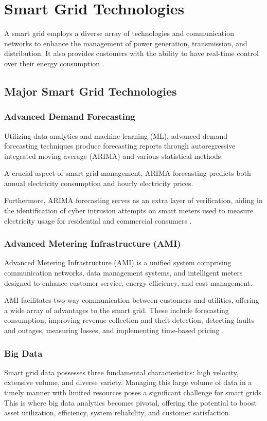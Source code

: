 \newpage







\section{Smart Grid Technologies }
A smart grid employs a diverse array of technologies and communication networks to enhance the management of power generation, transmission, and distribution. It also provides customers with the ability to have real-time control over their energy consumption \cite{WhatIsSmartgrid}.
\subsection{Major Smart Grid Technologies}
\subsubsection{Advanced Demand Forecasting}
Utilizing data analytics and machine learning (ML), advanced demand forecasting techniques produce forecasting reports through autoregressive integrated moving average (ARIMA) and various statistical methods.

A crucial aspect of smart grid management, ARIMA forecasting predicts both annual electricity consumption and hourly electricity prices.

Furthermore, ARIMA forecasting serves as an extra layer of verification, aiding in the identification of cyber intrusion attempts on smart meters used to measure electricity usage for residential and commercial consumers \cite{WhatIsSmartgrid}.
\subsubsection{Advanced Metering Infrastructure (AMI)}
Advanced Metering Infrastructure (AMI) is a unified system comprising communication networks, data management systems, and intelligent meters designed to enhance customer service, energy efficiency, and cost management.

AMI facilitates two-way communication between customers and utilities, offering a wide array of advantages to the smart grid. These include forecasting consumption, improving revenue collection and theft detection, detecting faults and outages, measuring losses, and implementing time-based pricing \cite{WhatIsSmartgrid}.  
\subsubsection{Big Data}
Smart grid data possesses three fundamental characteristics: high velocity, extensive volume, and diverse variety. Managing this large volume of data in a timely manner with limited resources poses a significant challenge for smart grids. This is where big data analytics becomes pivotal, offering the potential to boost asset utilization, efficiency, system reliability, and customer satisfaction.

